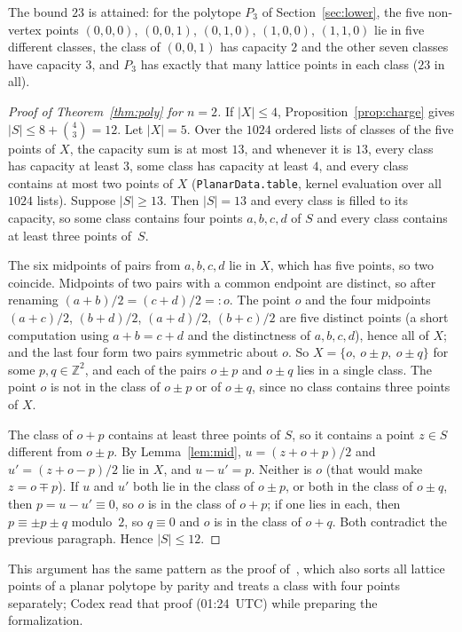 \documentclass[11pt]{article}
\theoremstyle{definition}
\theoremstyle{remark}
\newcommand{\Z}{\mathbb Z}
\begin{document}
\noindent The bound $23$ is attained: for the polytope $P_3$ of
Section~\ref{sec:lower}, the five non-vertex points
$(0,0,0)$, $(0,0,1)$, $(0,1,0)$, $(1,0,0)$, $(1,1,0)$ lie in five different
classes, the class of $(0,0,1)$ has capacity $2$ and the other seven classes
have capacity $3$, and $P_3$ has exactly that many lattice points in each class
($23$ in all).

\begin{proof}[Proof of Theorem~\ref{thm:poly} for $n=2$]
If $|X|\le4$, Proposition~\ref{prop:charge} gives
$|S|\le8+\binom43=12$. Let $|X|=5$. Over the $1024$ ordered lists of classes
of the five points of $X$, the capacity sum is at most $13$, and whenever it is
$13$, every class has capacity at least $3$, some class has capacity at least
$4$, and every class contains at most two points of $X$
(\texttt{PlanarData.table}, kernel evaluation over all $1024$ lists). Suppose
$|S|\ge13$. Then $|S|=13$ and every class is filled to its capacity, so some
class contains four points $a,b,c,d$ of $S$ and every class contains at least
three points of~$S$.

The six midpoints of pairs from $a,b,c,d$ lie in $X$, which has five points,
so two coincide. Midpoints of two pairs with a common endpoint are distinct,
so after renaming $(a+b)/2=(c+d)/2=:o$. The point $o$ and the four midpoints
$(a+c)/2$, $(b+d)/2$, $(a+d)/2$, $(b+c)/2$ are five distinct points (a short
computation using $a+b=c+d$ and the distinctness of $a,b,c,d$), hence all
of $X$; and the last four form two pairs symmetric about $o$. So
$X=\{o,\ o\pm p,\ o\pm q\}$ for some $p,q\in\Z^2$, and each of the pairs
$o\pm p$ and $o\pm q$ lies in a single class. The point $o$ is not in the
class of $o\pm p$ or of $o\pm q$, since no class contains three points of $X$.

The class of $o+p$ contains at least three points of $S$, so it contains a
point $z\in S$ different from $o\pm p$. By Lemma~\ref{lem:mid},
$u=(z+o+p)/2$ and $u'=(z+o-p)/2$ lie in $X$, and $u-u'=p$. Neither is $o$
(that would make $z=o\mp p$). If $u$ and $u'$ both lie in the class of
$o\pm p$, or both in the class of $o\pm q$, then $p=u-u'\equiv0$, so $o$ is in
the class of $o+p$; if one lies in each, then $p\equiv\pm p\pm q$ modulo~$2$,
so $q\equiv0$ and $o$ is in the class of $o+q$. Both contradict the previous
paragraph. Hence $|S|\le12$.
\end{proof}

\noindent This argument has the same pattern as the proof
of~\cite[Lemma~5.2]{chz}, which also sorts all lattice points of a planar
polytope by parity and treats a class with four points separately; Codex
read that proof (01:24~UTC) while preparing the formalization.
\end{document}
